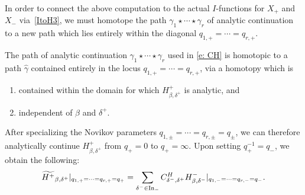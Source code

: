 In order to connect the above computation to the actual $I$-functions for $X_+$ and $X_-$ via~\eqref{ItoH3}, we must homotope the path $\gamma_1 \star \cdots \star \gamma_r$ of analytic continuation to a new path which lies entirely within the diagonal $q_{1, +} = \cdots =q_{r, +}$.
\begin{Proposition}\label{p:ancon}
The path of analytic continuation $\gamma_1 \star \cdots \star \gamma_r$ used in \eqref{e: CH} is homotopic to a path $\hat \gamma$ contained entirely in the locus $q_{1, +} = \cdots = q_{r, +}$, via a homotopy which is
\begin{enumerate}\itemsep=0pt
\item[$1)$] contained within the domain for which ${H^{+}_{\beta, \delta^+}}$ is analytic, and
\item[$2)$] independent of $\beta$ and $\delta^+$.
\end{enumerate}
After specializing the Novikov parameters $q_{1, \pm} = \cdots = q_{r, \pm} = q_\pm$, we can therefore analytically continue $H^{+}_{\beta, \delta^+}$ from $q_+ = 0$ to $q_+ = \infty$. Upon setting $q_+^{-1} = q_-$, we obtain the following:
\begin{equation}\label{e: CHspecial} \widetilde{H^{+}}_{\beta, \delta^+}|_{q_{1, +} = \cdots =q_{r, +} = q_+} = \sum_{\delta^- \in {\rm In}_-} C^H_{\delta^-, \delta^+} H^{-}_{\beta, \delta^-}|_{q_{1, -} = \cdots = q_{r, -} = q_-}.\end{equation}
\end{Proposition}
